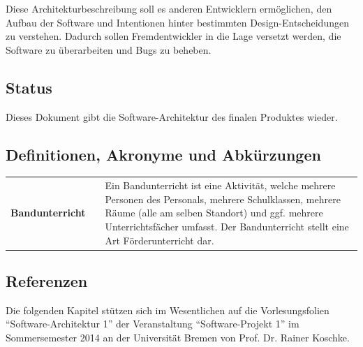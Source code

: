 \documentclass[fontsize=12pt,paper=a4,twoside]{scrartcl}
\renewcommand{\arraystretch}{1.2}
\begin{document}
Diese Architekturbeschreibung soll es anderen Entwicklern ermöglichen, den Aufbau der Software und Intentionen hinter bestimmten Design-Entscheidungen zu verstehen. Dadurch sollen Fremdentwickler in die Lage versetzt werden, die Software zu überarbeiten und Bugs zu beheben.

\subsection{Status}
Dieses Dokument gibt die Software-Architektur des finalen Produktes wieder.


  
\subsection{Definitionen, Akronyme und Abkürzungen}
\label{subsec:definitionen}
\renewcommand{\arraystretch}{2}
\begin{tabularx}{\textwidth}{Xp{1cm}p{9.5cm}}
\textbf{Bandunterricht} 	&  	& 	Ein Bandunterricht ist eine Aktivität, welche mehrere Personen des Personals, mehrere Schulklassen, mehrere Räume (alle am selben Standort) und ggf. mehrere Unterrichtsfächer umfasst. Der Bandunterricht stellt eine Art Förderunterricht dar. \\ 
\end{tabularx} 
\renewcommand{\arraystretch}{1.4}

\newpage
\subsection{Referenzen}
Die folgenden Kapitel stützen sich im Wesentlichen auf die Vorlesungsfolien "`Software-Architektur 1"' der Veranstaltung "`Software-Projekt 1"' im Sommersemester 2014 an der Universität Bremen von Prof. Dr. Rainer Koschke.
\end{document}
